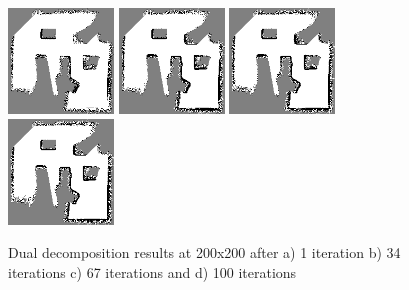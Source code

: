\documentclass[10pt,oneside,letterpaper]{article}
\begin{document}
\begin{figure}
  \includegraphics[width=0.25\textwidth]{dualdecomposition0_200x200.png}%
  \includegraphics[width=0.25\textwidth]{dualdecomposition33_200x200.png}%
  \includegraphics[width=0.25\textwidth]{dualdecomposition66_200x200.png}%
  \includegraphics[width=0.25\textwidth]{dualdecomposition98_200x200.png}
  \caption{Dual decomposition results at 200x200 after a) 1 iteration b) 34 iterations c) 67 iterations and d) 100 iterations}
  \label{fig:dualdecomposition200x200}
\end{figure}
\end{document}
